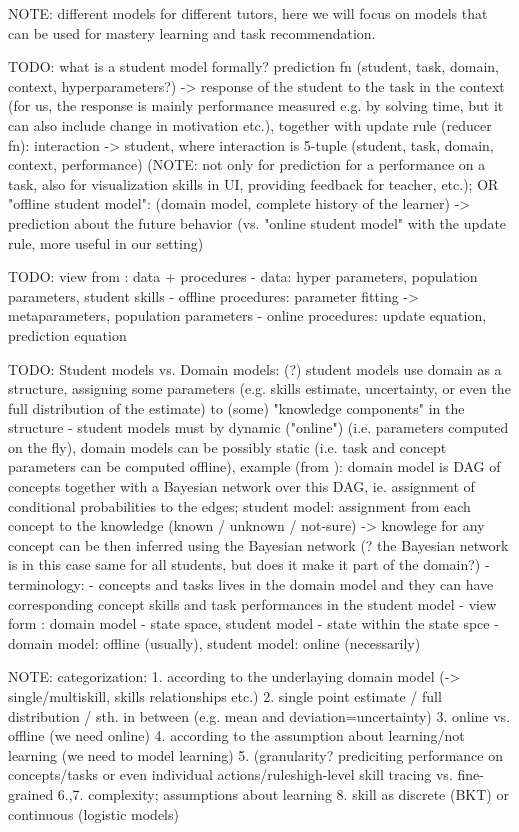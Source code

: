 NOTE: different models for different tutors,
here we will focus on models that can be used for mastery learning and task recommendation.


TODO: what is a student model formally?
prediction fn (student, task, domain, context, hyperparameters?) -> response of the student to the task in the context (for us, the response is mainly performance measured e.g. by solving time, but it can also include change in motivation etc.),
together with update rule (reducer fn): interaction -> student,
where interaction is 5-tuple (student, task, domain, context, performance)
(NOTE: not only for prediction for a performance on a task, also for
visualization skills in UI, providing feedback for teacher, etc.);
OR "offline student model": (domain model, complete history of the learner) -> prediction about the future behavior (vs. "online student model" with the update rule, more useful in our setting)

TODO: view from \cite{pelanek-learner-modeling}: data + procedures
- data: hyper parameters, population parameters, student skills
- offline procedures: parameter fitting -> metaparameters, population parameters
- online procedures: update equation, prediction equation

TODO: Student models vs. Domain models: (?) student models use domain as a
structure, assigning some parameters (e.g. skills estimate, uncertainty, or even
the full distribution of the estimate) to (some) "knowledge components" in the structure
- student models must by dynamic ("online") (i.e. parameters computed on the fly),
domain models can be possibly static (i.e. task and concept parameters can be computed offline),
example (from \cite{its-programming}): domain model is DAG of concepts together with a
Bayesian network over this DAG, ie. assignment of conditional probabilities to the edges;
student model: assignment from each concept to the knowledge (known / unknown / not-sure) -> knowlege for any concept can be then inferred using the Bayesian network
(? the Bayesian network is in this case same for all students, but does it make it part of the domain?)
- terminology:
  - concepts and tasks lives in the domain model and they can have corresponding
  concept skills and task performances in the student model
- view form \cite{its-learner-models}: domain model - state space, student model - state within the state spce
- domain model: offline (usually), student model: online (necessarily)



NOTE: categorization:
1. according to the underlaying domain model (-> single/multiskill, skills relationships etc.)
2. single point estimate / full distribution / sth. in between (e.g. mean and deviation=uncertainty)
3. online vs. offline (we need online)
4. according to the assumption about learning/not learning (we need to model learning)
5. (granularity? prediciting performance on concepts/tasks or even individual actions/ruleshigh-level skill tracing vs. fine-grained
6.,7. complexity; assumptions about learning \cite{pelanek-learner-modeling}
8. skill as discrete (BKT) or continuous (logistic models)




